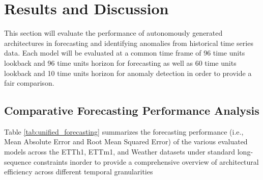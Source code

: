 \documentclass{article}
\begin{document}
\section{Results and Discussion}

This section will evaluate the performance of autonomously generated architectures in forecasting and identifying anomalies from historical time series data. Each model will be evaluated at a common time frame of 96 time units lookback and 96 time units horizon for forecasting as well as 60 time units lookback and 10 time units horizon for anomaly detection in order to provide a fair comparison.

\subsection{Comparative Forecasting Performance Analysis}
\label{subsec:foreper}
Table \ref{tab:unified_forecasting} summarizes the forecasting performance (i.e., Mean Absolute Error and Root Mean Squared Error) of the various evaluated models across the ETTh1, ETTm1, and Weather datasets under standard long-sequence constraints inorder to provide a comprehensive overview of architectural efficiency across different temporal granularities 
\end{document}
